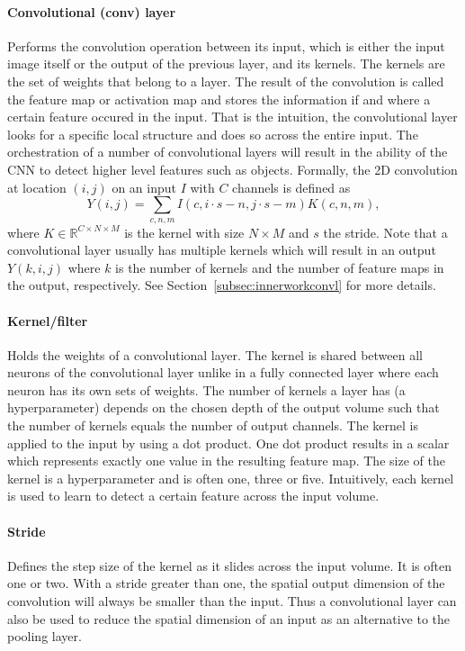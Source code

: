 \documentclass[a4paper,12pt]{report}
\begin{document}
\paragraph{Convolutional (conv) layer} Performs the convolution operation between its input, which is either the input image itself or the output of the previous layer, and its kernels. The kernels are the set of weights that belong to a layer. The result of the convolution is called the feature map or activation map and stores the information if and where a certain feature occured in the input. That is the intuition, the convolutional layer looks for a specific local structure and does so across the entire input. The orchestration of a number of convolutional layers will result in the ability of the CNN to detect higher level features such as objects. Formally, the 2D convolution at location $(i,j)$ on an input $I$ with $C$ channels is defined as
\begin{equation} \label{eq:0}
Y(i,j) = \sum_{c,n,m} I(c,i \cdot s - n, j \cdot s - m)K(c,n,m),
\end{equation}
where $K \in \mathbb{R}^{C \times N \times M}$ is the kernel with size $N \times M$ and $s$ the stride. Note that a convolutional layer usually has multiple kernels which will result in an output $Y(k,i,j)$ where $k$ is the number of kernels and the number of feature maps in the output, respectively. See Section~\ref{subsec:innerworkconvl} for more details. 
\paragraph{Kernel/filter            } Holds the weights of a convolutional layer. The kernel is shared between all neurons of the convolutional layer unlike in a fully connected layer where each neuron has its own sets of weights. The number of kernels a layer has (a hyperparameter) depends on the chosen depth of the output volume such that the number of kernels equals the number of output channels. The kernel is applied to the input by using a dot product. One dot product results in a scalar which represents exactly one value in the resulting feature map. The size of the kernel is a hyperparameter and is often one, three or five. Intuitively, each kernel is used to learn to detect a certain feature across the input volume.

\paragraph{Stride                   } Defines the step size of the kernel as it slides across the input volume. It is often one or two. With a stride greater than one, the spatial output dimension of the convolution will always be smaller than the input. Thus a convolutional layer can also be used to reduce the spatial dimension of an input as an alternative to the pooling layer.
\end{document}
